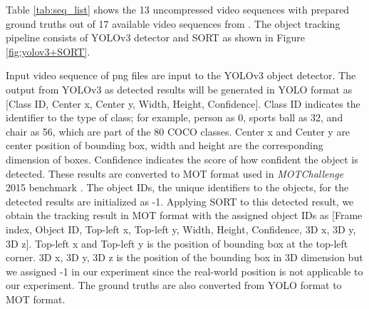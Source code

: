 Table \ref{tab:seq_list} shows the 13 uncompressed video sequences with prepared ground truths out of 17 available video sequences from \cite{choi_vcm_2020}. The object tracking pipeline consists of YOLOv3 detector and SORT as shown in Figure \ref{fig:yolov3+SORT}. 

Input video sequence of png files are input to the YOLOv3 object detector. The output from YOLOv3 as detected results will be generated in YOLO format as [Class ID, Center x, Center y, Width, Height, Confidence]. Class ID indicates the identifier to the type of class; for example, person as 0, sports ball as 32, and chair as 56, which are part of the 80 COCO classes. Center x and Center y are center position of bounding box, width and height are the corresponding dimension of boxes. Confidence indicates the score of how confident the object is detected. These results are converted to MOT format used in \textit{MOTChallenge} 2015 benchmark \cite{leal-taixe_motchallenge_2015}. The object IDs, the unique identifiers to the objects, for the detected results are initialized as -1. Applying SORT to this detected result, we obtain the tracking result in MOT format with the assigned object IDs as [Frame index, Object ID, Top-left x, Top-left y, Width, Height, Confidence, 3D x, 3D y, 3D z]. Top-left x and Top-left y is the position of bounding box at the top-left corner. 3D x, 3D y, 3D z is the position of the bounding box in 3D dimension but we assigned -1 in our experiment since the real-world position is not applicable to our experiment. The ground truths are also converted from YOLO format to MOT format.



